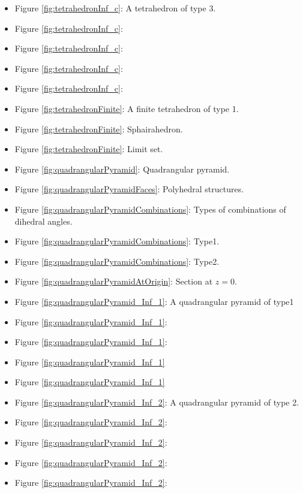 \documentclass[suppldata, dvipdfmx]{interact}
\theoremstyle{plain}%
\theoremstyle{definition}
\theoremstyle{remark}
\theoremstyle{problemstyle}
\begin{document}
\begin{itemize}
\item Figure \ref{fig:tetrahedronInf_c}: A tetrahedron of type 3.
\item Figure \ref{fig:tetrahedronInf_c}:
\item Figure
      \ref{fig:tetrahedronInf_c}:
\item Figure \ref{fig:tetrahedronInf_c}:
\item Figure \ref{fig:tetrahedronInf_c}:

\item Figure \ref{fig:tetrahedronFinite}: A finite tetrahedron of type
      1.
\item Figure
      \ref{fig:tetrahedronFinite}:
      Sphairahedron.
\item Figure
      \ref{fig:tetrahedronFinite}:
      Limit set. 

\item Figure \ref{fig:quadrangularPyramid}: Quadrangular pyramid.
\item Figure \ref{fig:quadrangularPyramidFaces}: Polyhedral structures.

\item Figure \ref{fig:quadrangularPyramidCombinations}: Types of
      combinations of dihedral angles.
\item Figure
      \ref{fig:quadrangularPyramidCombinations}:
      Type1.
\item Figure
      \ref{fig:quadrangularPyramidCombinations}:
      Type2.
\item Figure \ref{fig:quadrangularPyramidAtOrigin}: Section at $z=0$.
\item Figure \ref{fig:quadrangularPyramid_Inf_1}: A quadrangular pyramid
      of type1
\item Figure
      \ref{fig:quadrangularPyramid_Inf_1}:
\item Figure
      \ref{fig:quadrangularPyramid_Inf_1}:
\item Figure \ref{fig:quadrangularPyramid_Inf_1}
\item Figure
      \ref{fig:quadrangularPyramid_Inf_1}

\item Figure \ref{fig:quadrangularPyramid_Inf_2}: A quadrangular pyramid
      of type 2.
\item Figure
      \ref{fig:quadrangularPyramid_Inf_2}: 
\item Figure
      \ref{fig:quadrangularPyramid_Inf_2}: 
\item Figure \ref{fig:quadrangularPyramid_Inf_2}:
\item Figure
      \ref{fig:quadrangularPyramid_Inf_2}: 


\end{itemize}
\end{document}
